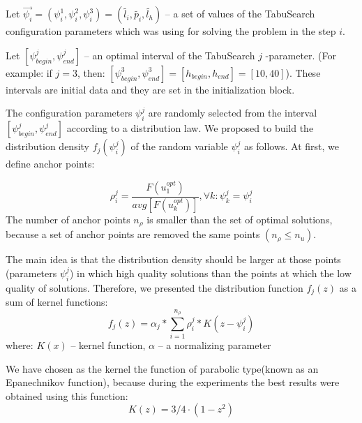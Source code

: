 \documentclass[]{TAACpaper}
\begin{document}
Let $\vec{\psi_i} = (\psi^1_i,\psi^2_i,\psi^3_i) = (\tilde{l_i},\tilde{p_i},\tilde{l_h})$ -- a set of values of the TabuSearch configuration parameters which was using for solving the problem in the step $i$.

Let $[\psi^j_{begin}, \psi^j_{end}]$ -- an optimal interval of the TabuSearch $j$ -parameter. (For example: if $j=3$, then: $[\psi^3_{begin}, \psi^3_{end}]= [h_{begin}, h_{end}] = [10, 40] $). These intervals are initial data and they are set in the initialization block. 

The configuration parameters  $\psi^j_i $ are randomly selected from the interval $[\psi^j_{begin}, \psi^j_{end}]$ according to a distribution law. We proposed to build the distribution density $f_j(\psi^j_i)$ of the random variable $\psi^j_i$ as follows. At first, we define anchor points:
 
 \begin{equation} \label{anchor_points}
     \rho^j_i =  \dfrac{F(u^{opt}_1)}{avg[F(u^{opt}_k)]}, \forall k: \psi^j_k = \psi^j_i
 \end{equation}
 The number of anchor points $n_{\rho}$  is smaller than the set of optimal solutions, because a set of  anchor points are removed the same points $(n_{\rho} \leq  n_u)$.
 
The main idea is that the distribution density should be larger at those points (parameters $\psi^j_i$) in which high quality solutions than the points at which the low quality of solutions.
Therefore, we presented the distribution function $f_j(z)$ as a sum of kernel functions:
 \begin{equation} \label{dist_density}
 f_j(z) = \alpha_j * \sum\limits_{i=1}^{n_{\rho}}  \rho^j_i * K(z -  \psi^j_i)
 \end{equation}
 where: $K(x)$ -- kernel function, $ \alpha$ -- a normalizing parameter
 
 We have chosen as the kernel the function of parabolic type(known as an Epanechnikov function),  because during the experiments the best results were obtained using this function:
 \begin{equation} \label{dist_density}
  K(z) = 3/4 \cdot (1-z^2)
 \end{equation}
 
\end{document}
